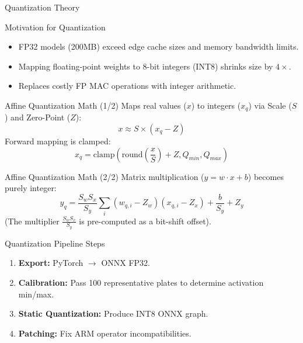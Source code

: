 \documentclass{beamer}
\begin{document}
\begin{frame}
    \centering
    \Huge Quantization Theory
\end{frame}

\begin{frame}{Motivation for Quantization}
\begin{itemize}
    \item FP32 models (200MB) exceed edge cache sizes and memory bandwidth limits.
    \item Mapping floating-point weights to 8-bit integers (INT8) shrinks size by $4\times$.
    \item Replaces costly FP MAC operations with integer arithmetic.
\end{itemize}
\end{frame}

\begin{frame}{Affine Quantization Math (1/2)}
Maps real values ($x$) to integers ($x_q$) via Scale ($S$) and Zero-Point ($Z$):
\begin{equation}
    x \approx S \times (x_q - Z)
\end{equation}
Forward mapping is clamped:
\begin{equation}
    x_q = \text{clamp}\left( \text{round}\left( \frac{x}{S} \right) + Z, Q_{min}, Q_{max} \right)
\end{equation}
\end{frame}

\begin{frame}{Affine Quantization Math (2/2)}
Matrix multiplication ($y = w \cdot x + b$) becomes purely integer:
\begin{equation}
    y_q = \frac{S_w S_x}{S_y} \sum_{i} (w_{q,i} - Z_w)(x_{q,i} - Z_x) + \frac{b}{S_y} + Z_y
\end{equation}
(The multiplier $\frac{S_w S_x}{S_y}$ is pre-computed as a bit-shift offset).
\end{frame}

\begin{frame}{Quantization Pipeline Steps}
\begin{enumerate}
    \item \textbf{Export:} PyTorch $\to$ ONNX FP32.
    \item \textbf{Calibration:} Pass 100 representative plates to determine activation min/max.
    \item \textbf{Static Quantization:} Produce INT8 ONNX graph.
    \item \textbf{Patching:} Fix ARM operator incompatibilities.
\end{enumerate}
\end{frame}
\end{document}
